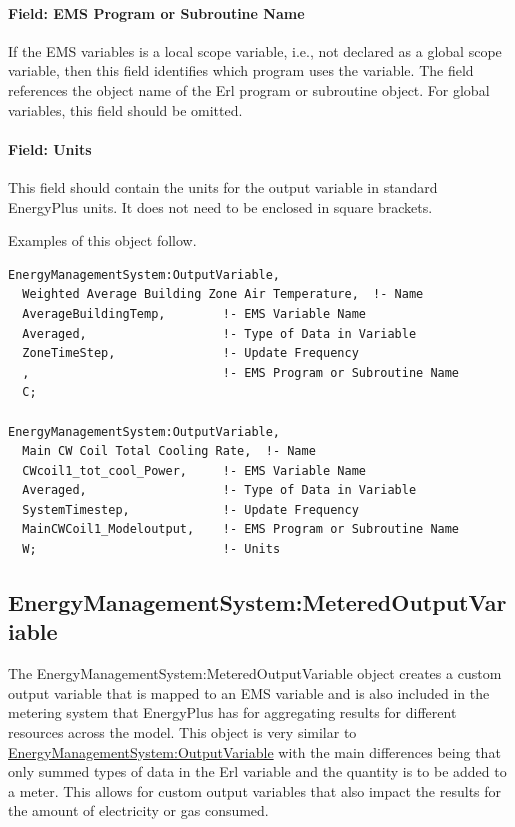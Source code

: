 \paragraph{Field: EMS Program or Subroutine Name}\label{field-ems-program-or-subroutine-name}

If the EMS variables is a local scope variable, i.e., not declared as a global scope variable, then this field identifies which program uses the variable. The field references the object name of the Erl program or subroutine object. For global variables, this field should be omitted.

\paragraph{Field: Units}\label{field-units}

This field should contain the units for the output variable in standard EnergyPlus units. It does not need to be enclosed in square brackets.

Examples of this object follow.

\begin{lstlisting}
EnergyManagementSystem:OutputVariable,
  Weighted Average Building Zone Air Temperature,  !- Name
  AverageBuildingTemp,        !- EMS Variable Name
  Averaged,                   !- Type of Data in Variable
  ZoneTimeStep,               !- Update Frequency
  ,                           !- EMS Program or Subroutine Name
  C;

EnergyManagementSystem:OutputVariable,
  Main CW Coil Total Cooling Rate,  !- Name
  CWcoil1_tot_cool_Power,     !- EMS Variable Name
  Averaged,                   !- Type of Data in Variable
  SystemTimestep,             !- Update Frequency
  MainCWCoil1_Modeloutput,    !- EMS Program or Subroutine Name
  W;                          !- Units
\end{lstlisting}

\subsection{EnergyManagementSystem:MeteredOutputVariable}\label{energymanagementsystemmeteredoutputvariable}

The EnergyManagementSystem:MeteredOutputVariable object creates a custom output variable that is mapped to an EMS variable and is also included in the metering system that EnergyPlus has for aggregating results for different resources across the model. This object is very similar to \hyperref[energymanagementsystemoutputvariable]{EnergyManagementSystem:OutputVariable} with the main differences being that only summed types of data in the Erl variable and the quantity is to be added to a meter. This allows for custom output variables that also impact the results for the amount of electricity or gas consumed.

